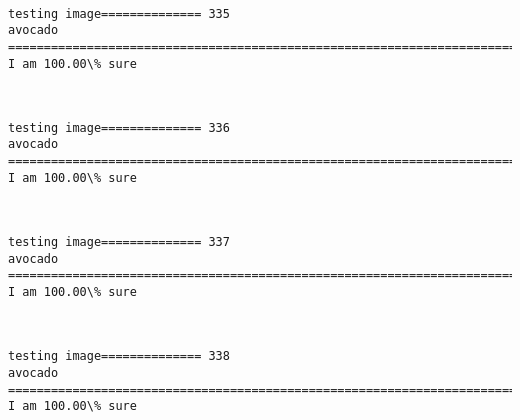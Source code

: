 \documentclass[11pt]{article}
\begin{document}
    \begin{center}
    \end{center}
    { \hspace*{\fill} \\}
    
    \begin{Verbatim}[commandchars=\\\{\}]
testing image============== 335
avocado
============================================================================
I am 100.00\% sure

    \end{Verbatim}

    \begin{center}
    \end{center}
    { \hspace*{\fill} \\}
    
    \begin{Verbatim}[commandchars=\\\{\}]
testing image============== 336
avocado
============================================================================
I am 100.00\% sure

    \end{Verbatim}

    \begin{center}
    \end{center}
    { \hspace*{\fill} \\}
    
    \begin{Verbatim}[commandchars=\\\{\}]
testing image============== 337
avocado
============================================================================
I am 100.00\% sure

    \end{Verbatim}

    \begin{center}
    \end{center}
    { \hspace*{\fill} \\}
    
    \begin{Verbatim}[commandchars=\\\{\}]
testing image============== 338
avocado
============================================================================
I am 100.00\% sure

    \end{Verbatim}
\end{document}
